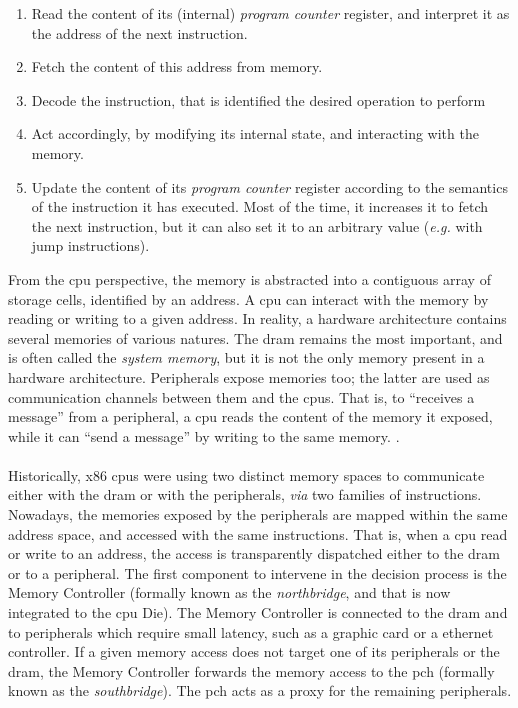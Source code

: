 \begin{enumerate}
\item Read the content of its (internal) \emph{program counter} register, and
  interpret it as the address of the next instruction.
%
\item Fetch the content of this address from memory.
%
\item Decode the instruction, that is identified the desired operation to
  perform
%
\item Act accordingly, by modifying its internal state, and interacting with the
  memory. 
%
\item Update the content of its \emph{program counter} register according to the
  semantics of the instruction it has executed. Most of the time, it increases
  it to fetch the next instruction, but it can also set it to an arbitrary value
  (\emph{e.g.} with jump instructions).
\end{enumerate}

From the \ac{cpu} perspective, the memory is abstracted into a contiguous array
of storage cells, identified by an address.
%
A \ac{cpu} can interact with the memory by reading or writing to a given
address.
%
In reality, a hardware architecture contains several memories of various natures.
%
The \ac{dram} remains the most important, and is often called the \emph{system
  memory}, but it is not the only memory present in a hardware architecture.
%
Peripherals expose memories too; the latter are used as communication channels
between them and the \acp{cpu}.
%
That is, to ``receives a message'' from a peripheral, a \ac{cpu} reads the
content of the memory it exposed, while it can ``send a message'' by writing to
the same memory. .

\paragraph{}
%
Historically, x86 \acp{cpu} were using two distinct memory spaces to communicate
either with the \ac{dram} or with the peripherals, \emph{via} two families of
instructions. 
%
Nowadays, the memories exposed by the peripherals are mapped within the same
address space, and accessed with the same instructions.
%
That is, when a \ac{cpu} read or write to an address, the access is
transparently dispatched either to the \ac{dram} or to a peripheral.
%
The first component to intervene in the decision process is the Memory
Controller (formally known as the \emph{northbridge}, and that is now integrated to the
\ac{cpu} Die).
%
The Memory Controller is connected to the \ac{dram} and to peripherals which
require small latency, such as a graphic card or a ethernet controller. 
%
If a given memory access does not target one of its peripherals or the
\ac{dram}, the Memory Controller forwards the memory access to the \ac{pch}
(formally known as the \emph{southbridge}).
%
The \ac{pch} acts as a proxy for the remaining peripherals.

